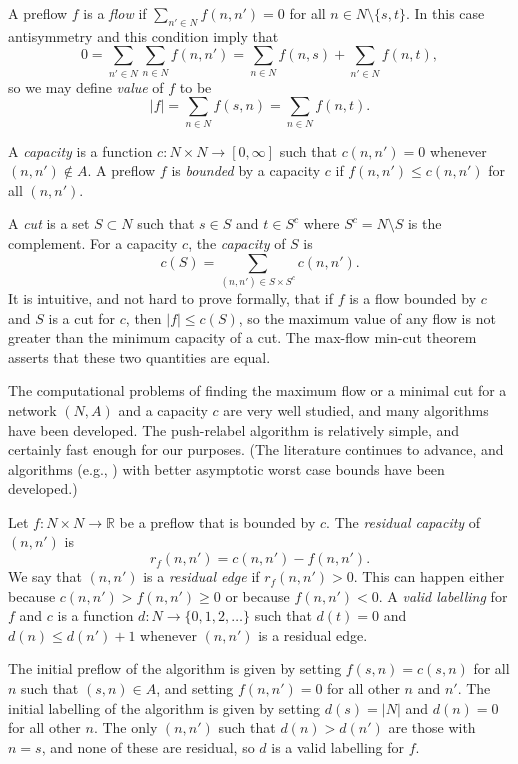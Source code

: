 \documentclass[12pt]{article}
\theoremstyle{definition}
\renewcommand{\Re}{\mathbb{R}}
\begin{document}
\begin{appendix}
A preflow $f$ is a \emph{flow} if $\sum_{n' \in N} f(n,n') = 0$ for
all $n \in N \setminus \{s,t\}$.  In this case antisymmetry and this
condition imply that
$$0 = \sum_{n' \in N}\sum_{n \in N} f(n,n') = \sum_{n \in N} f(n,s) + \sum_{n' \in N} f(n,t),$$
so we may define \emph{value} of $f$ to be
$$|f| = \sum_{n \in N} f(s,n) = \sum_{n \in N} f(n,t).$$

A \emph{capacity} is a function $c \colon N \times N \to [0,\infty]$
such that $c(n,n') = 0$ whenever $(n,n') \notin A$.  A preflow $f$ is
\emph{bounded} by a capacity $c$ if $f(n,n') \le c(n,n')$ for all
$(n,n')$.

A \emph{cut} is a
set $S \subset N$ such that $s \in S$ and $t \in S^c$ where $S^c = N
\setminus S$ is the complement.  For a capacity $c$, the
\emph{capacity} of $S$ is
$$c(S) = \sum_{(n,n') \in S \times S^c} c(n,n').$$ It is intuitive,
and not hard to prove formally, that if $f$ is a flow bounded by $c$
and $S$ is a cut for $c$, then $|f| \le c(S)$, so the maximum value of
any flow is not greater than the minimum capacity of a cut.  The
max-flow min-cut theorem \citep{FoFu56} asserts that these two
quantities are equal.

The computational problems of finding the maximum flow or a minimal
cut for a network $(N,A)$ and a capacity $c$ are very well studied,
and many algorithms have been developed.  The push-relabel algorithm
is relatively simple, and certainly fast enough for our purposes.
(The literature continues to advance, and algorithms (e.g.,
\cite{CKLGS22}) with better asymptotic worst case bounds have been
developed.)
  
Let $f \colon N \times N \to \Re$ be a preflow that is bounded by $c$.
The \emph{residual capacity} of $(n,n')$ is $$r_f(n,n') = c(n,n') -
f(n,n').$$ We say that $(n,n')$ is a \emph{residual edge} if
$r_f(n,n') > 0$.  This can happen either because $c(n,n') > f(n,n')
\ge 0$ or because $f(n,n') < 0$.  A \emph{valid labelling} for $f$ and
$c$ is a function $d \colon N \to \{0,1,2,\ldots\}$
such that $d(t) = 0$ and $d(n) \le d(n') + 1$ whenever $(n,n')$ is a
residual edge.

The initial preflow of the algorithm is given by setting $f(s,n) =
c(s,n)$ for all $n$ such that $(s,n) \in A$, and setting $f(n,n') = 0$
for all other $n$ and $n'$.  The initial labelling of the algorithm is
given by setting $d(s) = |N|$ and $d(n) = 0$ for all other $n$.  The
only $(n,n')$ such that $d(n) > d(n')$ are those with $n = s$, and
none of these are residual, so $d$ is a valid labelling for $f$.


\end{appendix}
\end{document}
